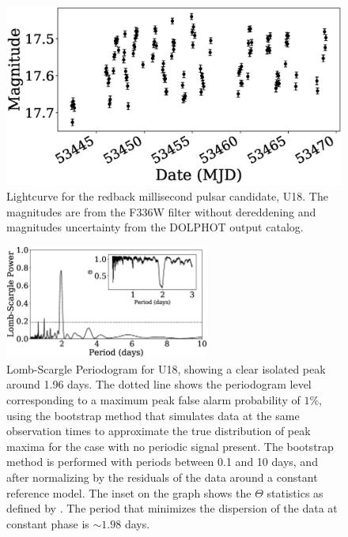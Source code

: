 \documentclass[fleqn,usenatbib,useAMS,letters]{mnras}
\begin{document}
\begin{figure}
	\includegraphics[width=\columnwidth]{lcurvemjd.eps}
    \caption{Lightcurve for the redback millisecond pulsar candidate, U18. The magnitudes are from the F336W filter without dereddening and magnitudes uncertainty from the DOLPHOT output catalog.}
    \label{fig:lc}
\end{figure}


 \begin{figure}
	\includegraphics[width=0.6\textwidth]{LandPDM.eps}
    \caption{Lomb-Scargle Periodogram for %
    U18, showing a clear isolated peak around 1.96 days. The dotted line shows the periodogram level corresponding to a maximum peak false alarm probability of $1\%$, using the bootstrap method that simulates data at the same observation times to approximate the true distribution of peak maxima for the case with no periodic signal present. The bootstrap method is performed with periods between 0.1 and 10 days, and after normalizing by the residuals of the data around a constant reference model. The inset on the graph shows the $\Theta$ statistics as defined by \protect\cite{PDMStellingwerf78}. The period that minimizes the dispersion of the data at constant phase is $\sim 1.98$ days. }
    \label{fig:periodogram}
\end{figure}
\end{document}
